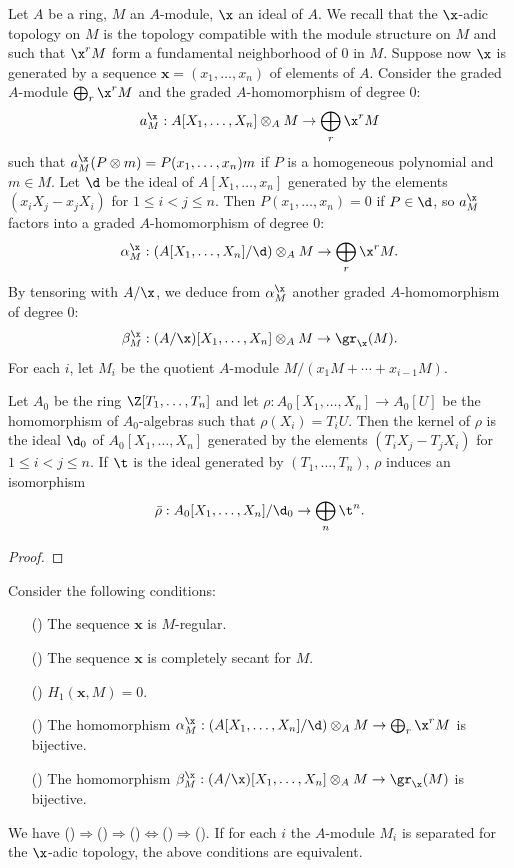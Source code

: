 Let $A$ be a ring, $M$ an $A$-module, $\x$ an ideal of $A$. We recall that the $\x$-adic topology on $M$ is the topology compatible with the module structure on $M$ and such that $\x^rM$ form a fundamental neighborhood of $0$ in $M$. Suppose now $\x$ is generated by a sequence $\bm{x}=(x_1,\dots,x_n)$ of elements of $A$. Consider the graded $A$-module $\bigoplus_r\x^rM$ and the graded $A$-homomorphism of degree $0$:
\[a_M^\x:A[X_1,\dots,X_n]\otimes_AM\to\bigoplus_r\x^rM\] 
such that $a_M^\x(P\otimes m)=P(x_1,\dots,x_n)m$ if $P$ is a homogeneous polynomial and $m\in M$. Let $\d$ be the ideal of $A[X_1,\dots,x_n]$ generated by the elements $(x_iX_j-x_jX_i)$ for $1\leq i<j\leq n$. Then $P(x_1,\dots,x_n)=0$ if $P\in\d$, so $a_M^\x$ factors into a graded $A$-homomorphism of degree $0$:
\[\alpha_M^\x:(A[X_1,\dots,X_n]/\d)\otimes_AM\to\bigoplus_r\x^rM.\]
By tensoring with $A/\x$, we deduce from $\alpha_M^\x$ another graded $A$-homomorphism of degree $0$:
\[\beta_M^\x:(A/\x)[X_1,\dots,X_n]\otimes_AM\to\gr_\x(M).\]
For each $i$, let $M_i$ be the quotient $A$-module $M/(x_1M+\cdots+x_{i-1}M)$.
\begin{lemma}\label{polynomial ring iterated multiplication map kernel char}
Let $A_0$ be the ring $\Z[T_1,\dots,T_n]$ and let $\rho:A_0[X_1,\dots,X_n]\to A_0[U]$ be the homomorphism of $A_0$-algebras such that $\rho(X_i)=T_iU$. Then the kernel of $\rho$ is the ideal $\d_0$ of $A_0[X_1,\dots,X_n]$ generated by the elements $(T_iX_j-T_jX_i)$ for $1\leq i<j\leq n$. If $\t$ is the ideal generated by $(T_1,\dots,T_n)$, $\rho$ induces an isomorphism
\[\bar{\rho}:A_0[X_1,\dots,X_n]/\d_0\to\bigoplus_n\t^n.\] 
\end{lemma}
\begin{proof}

\end{proof}
\begin{theorem}\label{Koszul complex completely secant crit}
Consider the following conditions:
\begin{itemize}
\item[(\rmnum{1})] The sequence $\bm{x}$ is $M$-regular.
\item[(\rmnum{2})] The sequence $\bm{x}$ is completely secant for $M$.
\item[(\rmnum{3})] $H_1(\bm{x},M)=0$.
\item[(\rmnum{4})] The homomorphism $\alpha_M^\x:(A[X_1,\dots,X_n]/\d)\otimes_AM\to\bigoplus_r\x^rM$ is bijective.
\item[(\rmnum{5})] The homomorphism $\beta_M^\x:(A/\x)[X_1,\dots,X_n]\otimes_AM\to\gr_\x(M)$ is bijective.
\end{itemize}
We have ()$\Rightarrow$()$\Rightarrow$()$\Leftrightarrow$()$\Rightarrow$(). If for each $i$ the $A$-module $M_i$ is separated for the $\x$-adic topology, the above conditions are equivalent. 
\end{theorem}
